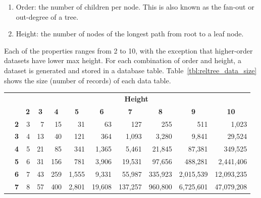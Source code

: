 \begin{enumerate}
\item Order: the number of children per node. This is also known as the fan-out or out-degree of a tree.
\item Height: the number of nodes of the longest path from root to a leaf node.
\end{enumerate} 

Each of the properties ranges from 2 to 10, with the exception that higher-order datasets have lower max height. For each combination of order and height, a dataset is generated and stored in a database table. Table~\ref{tbl:reltree_data_size} shows the size (number of records) of each data table.

\newcommand*\rot{\rotatebox{90}}

\begin{table}[h]
\begin{tabular}{lc|r|r|r|r|r|r|r|r|r|}
\cline{3-11}
 & \multicolumn{1}{l}{} & \multicolumn{9}{|c|}{\textbf{Height}} \\ \cline{3-11} 
 & \multicolumn{1}{l}{} & \multicolumn{1}{|c}{\textbf{2}} & \multicolumn{1}{|c}{\textbf{3}} & \multicolumn{1}{|c}{\textbf{4}} & \multicolumn{1}{|c}{\textbf{5}} & \multicolumn{1}{|c}{\textbf{6}} & \multicolumn{1}{|c}{\textbf{7}} & \multicolumn{1}{|c}{\textbf{8}} & \multicolumn{1}{|c}{\textbf{9}} & \multicolumn{1}{|c|}{\textbf{10}} \\ \hline
\multicolumn{1}{|l}{\multirow{9}{*}{\rot{\textbf{Order}}}} & \multicolumn{1}{|c|}{\textbf{2}} & 3 & 7 & 15 & 31 & 63 & 127 & 255 & 511 & 1,023 \\ \cline{2-11} 
\multicolumn{1}{|l}{\textbf{}} & \multicolumn{1}{|c|}{\textbf{3}} & 4 & 13 & 40 & 121 & 364 & 1,093 & 3,280 & 9,841 & 29,524 \\ \cline{2-11} 
\multicolumn{1}{|l}{\textbf{}} & \multicolumn{1}{|c|}{\textbf{4}} & 5 & 21 & 85 & 341 & 1,365 & 5,461 & 21,845 & 87,381 & 349,525 \\ \cline{2-11} 
\multicolumn{1}{|l}{\textbf{}} & \multicolumn{1}{|c|}{\textbf{5}} & 6 & 31 & 156 & 781 & 3,906 & 19,531 & 97,656 & 488,281 & 2,441,406 \\ \cline{2-11} 
\multicolumn{1}{|l}{\textbf{}} & \multicolumn{1}{|c|}{\textbf{6}} & 7 & 43 & 259 & 1,555 & 9,331 & 55,987 & 335,923 & 2,015,539 & 12,093,235 \\ \cline{2-11} 
\multicolumn{1}{|l}{\textbf{}} & \multicolumn{1}{|c|}{\textbf{7}} & 8 & 57 & 400 & 2,801 & 19,608 & 137,257 & 960,800 & 6,725,601 & 47,079,208 \\ \cline{2-11} 

\end{tabular}
\end{table}
